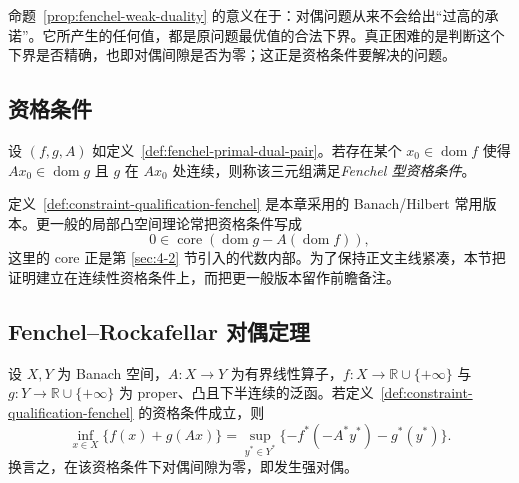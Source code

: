\begin{remark}
命题~\ref{prop:fenchel-weak-duality} 的意义在于：对偶问题从来不会给出“过高的承诺”。它所产生的任何值，都是原问题最优值的合法下界。真正困难的是判断这个下界是否精确，也即对偶间隙是否为零；这正是资格条件要解决的问题。
\end{remark}

\subsection{资格条件}

\begin{definition}\label{def:constraint-qualification-fenchel}
设 $(f,g,A)$ 如定义~\ref{def:fenchel-primal-dual-pair}。若存在某个 $x_0\in \operatorname{dom}f$ 使得 $Ax_0\in \operatorname{dom}g$ 且 $g$ 在 $Ax_0$ 处连续，则称该三元组满足\emph{Fenchel 型资格条件}。
\end{definition}

\begin{remark}
定义~\ref{def:constraint-qualification-fenchel} 是本章采用的 Banach/Hilbert 常用版本。更一般的局部凸空间理论常把资格条件写成
\[
0\in \operatorname{core}(\operatorname{dom}g-A(\operatorname{dom}f)),
\]
这里的 core 正是第 \ref{sec:4-2} 节引入的代数内部。为了保持正文主线紧凑，本节把证明建立在连续性资格条件上，而把更一般版本留作前瞻备注。
\end{remark}

\subsection{Fenchel--Rockafellar 对偶定理}

\begin{theorem}\label{thm:fenchel-rockafellar-duality}
设 $X,Y$ 为 Banach 空间，$A\colon X\to Y$ 为有界线性算子，$f\colon X\to \mathbb R\cup\{+\infty\}$ 与 $g\colon Y\to \mathbb R\cup\{+\infty\}$ 为 proper、凸且下半连续的泛函。若定义~\ref{def:constraint-qualification-fenchel} 的资格条件成立，则
\[
\inf_{x\in X}\{f(x)+g(Ax)\}
=
\sup_{y^\ast\in Y^\ast}\{-f^\ast(-A^\ast y^\ast)-g^\ast(y^\ast)\}.
\]
换言之，在该资格条件下对偶间隙为零，即发生强对偶。
\end{theorem}

